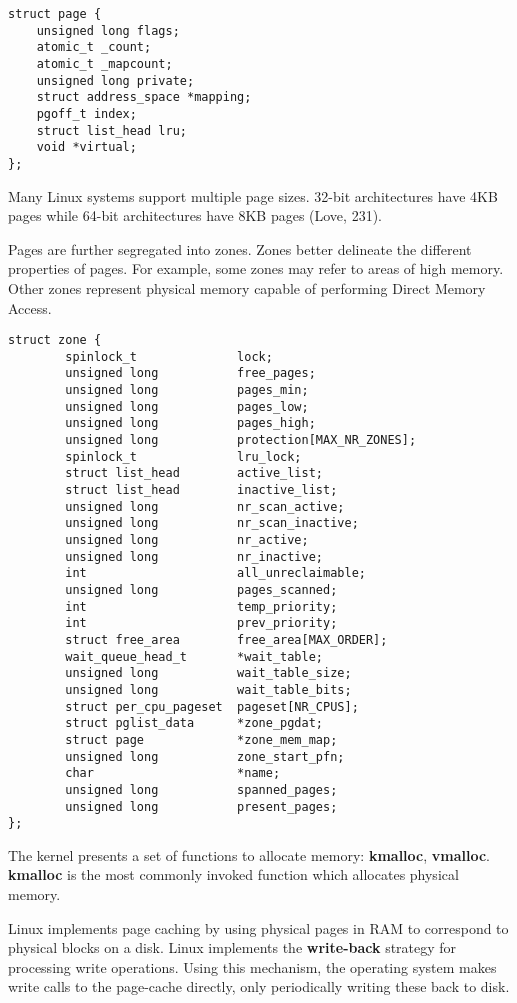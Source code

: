 \documentclass[onecolumn,10pt]{IEEETran}
\begin{document}
\begin{lstlisting}
struct page {
	unsigned long flags;
	atomic_t _count;
	atomic_t _mapcount;
	unsigned long private;
	struct address_space *mapping;
	pgoff_t index;
	struct list_head lru;
	void *virtual;
};
\end{lstlisting}

Many Linux systems support multiple page sizes.  32-bit architectures have 4KB pages while 64-bit architectures have 8KB pages (Love, 231).

Pages are further segregated into zones.  Zones better delineate the different properties of pages.  For example, some zones may refer to areas of high memory.  Other zones represent physical memory capable of performing Direct Memory Access.

\begin{lstlisting}
struct zone {
        spinlock_t              lock;
        unsigned long           free_pages;
        unsigned long           pages_min;
        unsigned long           pages_low;
        unsigned long           pages_high;
        unsigned long           protection[MAX_NR_ZONES];
        spinlock_t              lru_lock;
        struct list_head        active_list;
        struct list_head        inactive_list;
        unsigned long           nr_scan_active;
        unsigned long           nr_scan_inactive;
        unsigned long           nr_active;
        unsigned long           nr_inactive;
        int                     all_unreclaimable;
        unsigned long           pages_scanned;
        int                     temp_priority;
        int                     prev_priority;
        struct free_area        free_area[MAX_ORDER];
        wait_queue_head_t       *wait_table;
        unsigned long           wait_table_size;
        unsigned long           wait_table_bits;
        struct per_cpu_pageset  pageset[NR_CPUS];
        struct pglist_data      *zone_pgdat;
        struct page             *zone_mem_map;
        unsigned long           zone_start_pfn;
        char                    *name;
        unsigned long           spanned_pages;
        unsigned long           present_pages;
};
\end{lstlisting}

The kernel presents a set of functions to allocate memory: \textbf{kmalloc}, \textbf{vmalloc}. \textbf{kmalloc} is the most commonly invoked function which allocates physical memory.

Linux implements page caching by using physical pages in RAM to correspond to physical blocks on a disk.  Linux implements the \textbf{write-back} strategy for processing write operations.  Using this mechanism, the operating system makes write calls to the page-cache directly, only periodically writing these back to disk.
\end{document}
